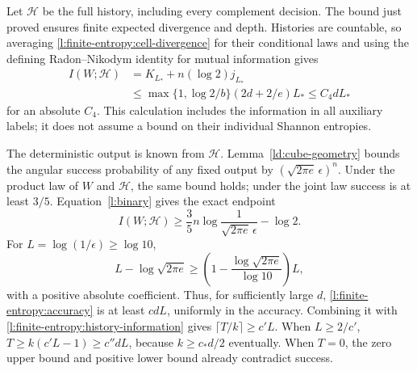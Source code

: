 Let \(\mathcal H\) be the full history, including every complement
decision. The bound just proved ensures finite expected divergence
and depth. Histories are countable, so averaging
\eqref{l:finite-entropy:cell-divergence} for their conditional laws
and using the defining Radon--Nikodym identity for mutual information
gives
\begin{equation}\label{l:finite-entropy:history-information}
 \begin{split}
 I(W;\mathcal H)
 &=K_{L_*}+n(\log2)j_{L_*}\\
 &\le\max\{1,\log2/b\}(2d+2/e)L_*
 \le C_4dL_*
 \end{split}
\end{equation}
for an absolute \(C_4\).  This calculation includes the information
in all auxiliary labels; it does not assume a bound on their individual
Shannon entropies.

The deterministic output is known from \(\mathcal H\).
Lemma~\ref{ld:cube-geometry} bounds the angular success probability
of any fixed output by \((\sqrt{2\pi e}\,\epsilon)^n\).
Under the product law of
\(W\) and \(\mathcal H\), the same bound holds; under the joint
law success is at least \(3/5\).  Equation~\eqref{l:binary} gives
the exact endpoint
\begin{equation}\label{l:finite-entropy:accuracy}
 I(W;\mathcal H)
 \ge\frac35n\log\frac1{\sqrt{2\pi e}\,\epsilon}-\log2.
\end{equation}
For \(L=\log(1/\epsilon)\ge\log10\),
\[
 L-\log\sqrt{2\pi e}
 \ge\left(1-\frac{\log\sqrt{2\pi e}}{\log10}\right)L,
\]
with a positive absolute coefficient.  Thus, for sufficiently large
\(d\), \eqref{l:finite-entropy:accuracy} is at least \(cdL\),
uniformly in the accuracy.  Combining it with
\eqref{l:finite-entropy:history-information} gives
\(\lceil T/k\rceil\ge c'L\).  When \(L\ge2/c'\),
\(T\ge k(c'L-1)\ge c''dL\), because \(k\ge c_*d/2\)
eventually.  When \(T=0\), the zero upper bound and positive lower
bound already contradict success.

